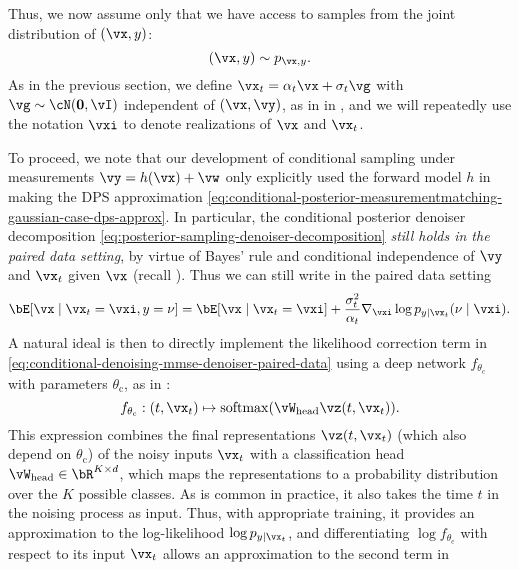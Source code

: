 \documentclass[../../book-main.tex]{subfiles}
\begin{document}
Thus, we now assume only that we have access to samples from the joint
distribution of $(\vx, y)$:
\begin{equation}
  (\vx, y) \sim p_{\vx, y}.
\end{equation}
As in the previous section, we define $\vx_t = \alpha_t \vx + \sigma_t \vg$
with $\vg \sim \cN(\Zero, \vI)$ independent of $(\vx, \vy)$, as in
 in ,
and we will repeatedly use the notation $\vxi$ to denote realizations of $\vx$
and $\vx_t$.

To proceed, we note that our development of conditional sampling under
measurements $\vy = h(\vx) + \vw$ only explicitly used the
forward model $h$ in making the DPS approximation
\eqref{eq:conditional-posterior-measurementmatching-gaussian-case-dps-approx}.
In particular, the conditional posterior denoiser decomposition
\eqref{eq:posterior-sampling-denoiser-decomposition} \textit{still holds in the
paired data setting}, by virtue of Bayes' rule
and conditional independence of $\vy$ and $\vx_t$ given $\vx$ (recall
). Thus we can still write in the paired
data setting
\begin{equation}\label{eq:conditional-denoising-mmse-denoiser-paired-data}
  \bE[ \vx \mid \vx_t=\vxi, y=\nu]
  =
  \bE[\vx \mid \vx_t=\vxi] 
  + \frac{\sigma_t^2}{\alpha_t} 
  \nabla_{\vxi}\log p_{y \mid \vx_t}(\nu\mid \vxi).
\end{equation}
A natural ideal is then to directly implement the likelihood correction term in
\eqref{eq:conditional-denoising-mmse-denoiser-paired-data} using a deep network
$f_{\theta_{\mathrm{c}}}$ with parameters $\theta_{\mathrm{c}}$, as in
: 
\begin{equation}
  f_{\theta_{\mathrm{c}}} : (t, \vx_t) \mapsto \softmax(\vW_{\mathrm{head}}
  \vz(t, \vx_t)).
\end{equation}
This expression combines the final representations $\vz(t, \vx_t)$ (which also depend on
$\theta_{\mathrm{c}}$) of the noisy inputs
$\vx_t$ with a classification head $\vW_{\mathrm{head}} \in \bR^{K \times d}$, which maps the
representations to a probability distribution over the $K$ possible classes.
As is common in practice, it also takes the time $t$ in the noising process as
input.
Thus, with appropriate training, it provides an approximation to the log-likelihood
$\log p_{y \mid \vx_t}$, and differentiating $\log f_{\theta_{\mathrm{c}}}$ with
respect to its input $\vx_t$
allows an approximation to the second term in
\end{document}
